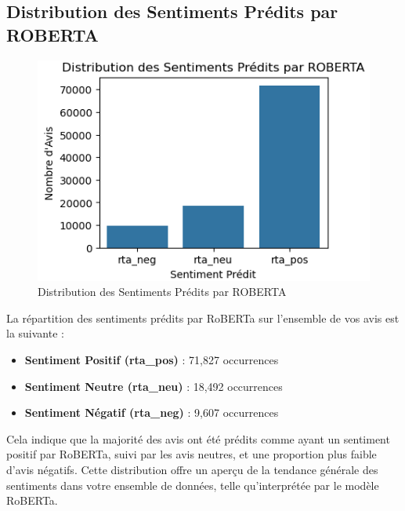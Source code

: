 \subsection{Distribution des Sentiments Prédits par ROBERTA}
\begin{figure}[h]
    \centering
    \includegraphics[scale=0.7]{assets/distributiondessentimentRoberta.PNG}
    \caption{Distribution des Sentiments Prédits par ROBERTA}
    \label{fig:robertaSentiments}
\end{figure}

La répartition des sentiments prédits par RoBERTa sur l'ensemble de vos avis est la suivante :

\begin{itemize}
    \item \textbf{Sentiment Positif (rta\_pos)} : 71,827 occurrences
    \item \textbf{Sentiment Neutre (rta\_neu)} : 18,492 occurrences
    \item \textbf{Sentiment Négatif (rta\_neg)} : 9,607 occurrences
\end{itemize}

Cela indique que la majorité des avis ont été prédits comme ayant un sentiment positif par RoBERTa, suivi par les avis neutres, et une proportion plus faible d'avis négatifs. Cette distribution offre un aperçu de la tendance générale des sentiments dans votre ensemble de données, telle qu'interprétée par le modèle RoBERTa.

\newpage
